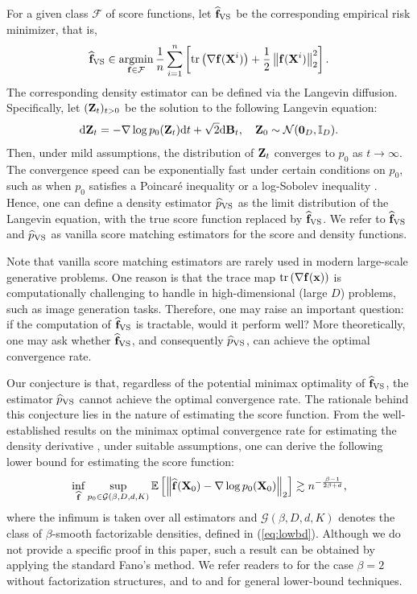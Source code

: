 \documentclass[twoside,11pt]{article}
\def\cF{\mathcal F}
\def\cG{\mathcal G}
\def\cN{\mathcal N}
\newcommand{\bB}{{\bf B}}
\newcommand{\bff}{{\bf f}}
\newcommand{\bx}{{\bf x}}
\newcommand{\bX}{{\bf X}}
\newcommand{\bZ}{{\bf Z}}
\newcommand{\bbE}{{\mathbb E}}
\newcommand{\bbI}{{\mathbb I}}
\newcommand{\be}{\begin{equation}}
\newcommand{\ee}{\end{equation}}
\newcommand{\bean}{\setlength\arraycolsep{1pt}\begin{eqnarray*}}
\newcommand{\eean}{\end{eqnarray*}}
\DeclareMathOperator*{\argmin}{argmin}
\def\d{{\rm d}}
\begin{document}
For a given class $\cF$ of score functions, let $\widehat \bff_{\rm VS}$ be the corresponding empirical risk minimizer, that is,
\bean
 \widehat \bff_{\rm VS} \in \argmin_{\bff \in \cF}\frac{1}{n} \sum_{i=1}^n \left[ \text{tr} \left( \nabla \bff(\bX^i) \right) + \frac{1}{2} \left\| \bff(\bX^i) \right\|_2^2 \right].
\eean
The corresponding density estimator can be defined via the Langevin diffusion.
Specifically, let $( \bZ_{t} )_{t > 0} $ be the solution to the following Langevin equation:
\bean
\d \bZ_t = - \nabla \log p_{0} ( \bZ_{t} ) \d t + \sqrt{2} \d \bB_t, \quad \bZ_0 \sim \cN ( \mathbf{0}_{D}, \bbI_{D} ).
\eean
Then, under mild assumptions, the distribution of $\bZ_t$ converges to $p_0$ as $t \to \infty$.
The convergence speed can be exponentially fast under certain conditions on $p_0$, such as when $p_0$ satisfies a Poincar{\'e}  inequality or a log-Sobolev inequality \citep{bakry2014analysis}.
Hence, one can define a density estimator $\widehat p_{\rm VS}$ as the limit distribution of the Langevin equation, with the true score function replaced by $\widehat \bff_{\rm VS}$.
We refer to $\widehat \bff_{\rm VS}$ and $\widehat p_{\rm VS}$ as vanilla score matching estimators for the score and density functions.

Note that vanilla score matching estimators are rarely used in modern large-scale generative problems.
One reason is that the trace map $\text{tr} \left( \nabla \bff(\bx) \right)$ is computationally challenging to handle in high-dimensional (large $D$) problems, such as image generation tasks.
Therefore, one may raise an important question: if the computation of $\widehat \bff_{\rm VS}$ is tractable, would it perform well?
More theoretically, one may ask whether $\widehat \bff_{\rm VS}$, and consequently $\widehat p_{\rm VS}$, can achieve the optimal convergence rate.

Our conjecture is that, regardless of the potential minimax optimality of $\widehat{\bff}_{\rm VS}$, the estimator $\widehat{p}_{\rm VS}$ cannot achieve the optimal convergence rate.
The rationale behind this conjecture lies in the nature of estimating the score function.
From the well-established results on the minimax optimal convergence rate for estimating the density derivative \citep{stone1982optimal, singh1977improvement, shen2017posterior, yoo2016supremum}, under suitable assumptions, one can derive the following lower bound for estimating the score function:
\be
\inf_{\widehat \bff} \sup_{p_0 \in \cG(\beta,D,d,K)}  \bbE \left[ \left\| \widehat \bff(\bX_{0}) - \nabla \log p_0(\bX_0) \right\|_2 \right]
\gtrsim n^{-\frac{\beta-1}{2\beta+d}}, \label{eq:rate-ns} 
\ee
where the infimum is taken over all estimators and $\cG(\beta,D,d,K)$ denotes the class of $\beta$-smooth factorizable densities, defined in (\ref{eq:lowbd}).
Although we do not provide a specific proof in this paper, such a result can be obtained by applying the standard Fano’s method. We refer readers to \citet{wibisono2024} for the case $\beta = 2$ without factorization structures, and to \citet{tsybakov2008introduction} and \citet{wainwright2019high} for general lower-bound techniques.
\end{document}
